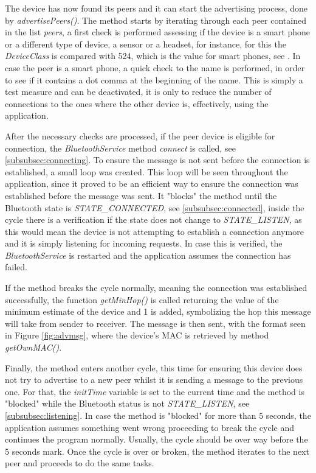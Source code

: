 The device has now found its peers and it can start the advertising process, done by \textit{advertisePeers()}. The method starts by iterating through each peer contained in the list \textit{peers}, a first check is performed assessing if the device is a smart phone or a different type of device, a sensor or a headset, for instance, for this the \textit{DeviceClass} is compared with 524, which is the value for smart phones, see \cite{btclass}. 
In case the peer is a smart phone, a quick check to the name is performed, in order to see if it contains a dot comma at the beginning of the name. This is simply a test measure and can be deactivated, it is only to reduce the number of connections to the ones where the other device is, effectively, using the application.

After the necessary checks are processed, if the peer device is eligible for connection, the \textit{BluetoothService} method \textit{connect} is called, see \ref{subsubsec:connecting}. To ensure the message is not sent before the connection is established, a small loop was created. This loop will be seen throughout the application, since it proved to be an efficient way to ensure the connection was established before the message was sent. It "blocks" the method until the Bluetooth state is \textit{STATE\_CONNECTED}, see \ref{subsubsec:connected}, inside the cycle there is a verification if the state does not change to \textit{STATE\_LISTEN}, as this would mean the device is not attempting to establish a connection anymore and it is simply listening for incoming requests. In case this is verified, the \textit{BluetoothService} is restarted and the application assumes the connection has failed.

If the method breaks the cycle normally, meaning the connection was established successfully, the function \textit{getMinHop()} is called returning the value of the minimum estimate of the device and 1 is added, symbolizing the hop this message will take from sender to receiver. The message is then sent, with the format seen in Figure \ref{fig:advmsg}, where the device's \gls{MAC} is retrieved by method \textit{getOwnMAC()}.

Finally, the method enters another cycle, this time for ensuring this device does not try to advertise to a new peer whilst it is sending a message to the previous one. For that, the \textit{initTime} variable is set to the current time and the method is "blocked" while the Bluetooth status is not \textit{STATE\_LISTEN}, see \ref{subsubsec:listening}. In case the method is "blocked" for more than 5 seconds, the application assumes something went wrong proceeding to break the cycle and continues the program normally. Usually, the cycle should be over way before the 5 seconds mark. Once the cycle is over or broken, the method iterates to the next peer and proceeds to do the same tasks.

